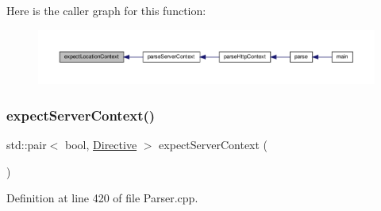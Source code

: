 Here is the caller graph for this function\+:
\nopagebreak
\begin{figure}[H]
\begin{center}
\leavevmode
\includegraphics[width=350pt]{classft_1_1_parser_a002b236022851df6ef2203aab9b24a73_icgraph}
\end{center}
\end{figure}
\mbox{\label{classft_1_1_parser_a72f108d920a35284bf8f740bb8240acd}} 
\subsubsection{\texorpdfstring{expect\+Server\+Context()}{expectServerContext()}}
{\footnotesize\ttfamily std\+::pair$<$ bool, \hyperlink{classft_1_1_directive}{Directive} $>$ expect\+Server\+Context (\begin{DoxyParamCaption}{ }\end{DoxyParamCaption})}



Definition at line 420 of file Parser.\+cpp.


